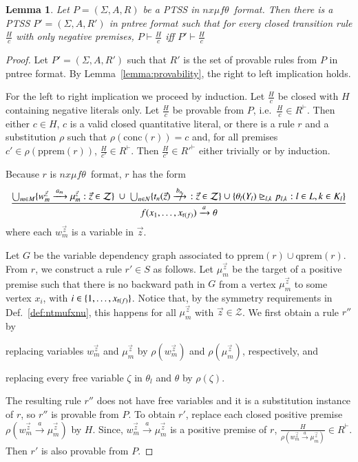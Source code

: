 \documentclass[submission,copyright,creativecommons]{eptcs}
\newtheorem{lemma}{Lemma}
\newcommand{\ddedrule}[2]{\frac{\displaystyle #1}{\displaystyle #2}}
\newcommand{\dedrule}[2]{\frac{#1}{#2}}
\newcommand{\trans}[1][]{\xrightarrow{\, {#1} \, }}
\newcommand{\ntrans}[1][]{\mathrel{{\trans[#1]}\makebox[0em][r]{$\not$\hspace{2ex}}}{\!}}
\newcommand{\gtgeq}{\trianglerighteq}
\newcommand{\rank}{\mathop{\sf r}}
\newcommand{\pprem}[1]{\textrm{pprem}(#1)}
\newcommand{\qprem}[1]{\textrm{qprem}(#1)}
\newcommand{\conc}[1]{\textrm{conc}(#1)}
\newcommand{\nxmuft}{\ensuremath{\textit{nx}\mu\textit{f}\theta}}
\newcommand{\proves}{\vdash}
\begin{document}
\begin{lemma}\label{lemma:pntree}
  Let $P = (\Sigma,A, R)$ be a PTSS in \nxmuft\ format.
  Then there is a PTSS $P' = (\Sigma, A, R')$ in
  pntree format such that for every closed transition rule $\dedrule{H}{c}$
  with only negative premises,
  $P \proves \dedrule{H}{c}$ iff $P' \proves \dedrule{H}{c}$
\end{lemma}
\begin{proof}
 Let $P' = (\Sigma, A, R')$ such that $R'$ is the set of provable rules 
 from $P$ in pntree format. 
 By Lemma~\ref{lemma:provability}, the right to left implication holds. 

 For the left to right implication we proceed by induction.
Let $\dedrule{H}{c}$ be closed with $H$ containing negative literals
 only. Let $\dedrule{H}{c}$ be provable from $P$,
 i.e.\ $\dedrule{H}{c}\in R^\proves$.  Then either $c\in H$, $c$ is a
 valid closed quantitative literal, or there is a rule $r$ and a
 substitution $\rho$ such that $\rho(\conc{r}) = c$ and, for all
 premises $c' \in \rho(\pprem{r})$, $\dedrule{H}{c'}\in R^\proves$.
 Then $\dedrule{H}{c'}\in {R'}^\proves$ either trivially or by
 induction.

 Because $r$ is \nxmuft\ format, $r$ has the form
\[
 \ddedrule {
	{\textstyle
         \bigcup_{m\in M}
           \{ w_m^{\vec{z}} \trans[a_m]\mu_m^{\vec{z}} : \vec{z}\in \mathcal{Z} \} \ \cup \
         \bigcup_{n\in N}
           \{ t_n(\vec{z})\ntrans[b_n] : \vec{z}\in \mathcal{Z} \} \  \cup \
	  }
{\textstyle
	    \{ \theta_l(Y_l)\gtgeq_{l,k} p_{l,k} : l\in L, k \in K_l \}
	  }
      }
      {f(x_1,\ldots,x_{\rank(f)}) \trans[a] \theta }
 \]
where each $w_m^{\vec{z}}$ is a variable in $\vec{z}$.


 Let $G$ be the variable dependency graph associated to
 $\pprem{r}\cup\qprem{r}$.
From $r$, we construct a rule $r'\in S$ as follows.
Let $\mu_m^{\vec{z}}$ be the target of a positive premise such that
 there is no backward path in $G$ from a vertex $\mu_m^{\vec{z}}$ to
 some vertex $x_i$, with $i\in\{1,\ldots,x_{\rank(f)}\}$.  Notice
 that, by the symmetry requirements in Def.~\ref{def:ntmufxnu}, this
 happens for all $\mu_m^{\vec{z}}$ with $\vec{z}\in\mathcal{Z}$.
We first obtain a rule $r''$ by
 \begin{inparaenum}[(i)]
 \item replacing variables $w_m^{\vec{z}}$ and $\mu_m^{\vec{z}}$ by
   $\rho(w_m^{\vec{z}})$ and $\rho(\mu_m^{\vec{z}})$, respectively,
   and
 \item replacing every free variable $\zeta$ in $\theta_l$ and $\theta$ by
   $\rho(\zeta)$.
 \end{inparaenum}
The resulting rule $r''$ does not have free variables and it is a
 substitution instance of $r$, so $r''$ is provable from $P$.
To obtain $r'$, replace each closed positive premise
 $\rho(w_m^{\vec{z}}\trans[a]\mu_m^{\vec{z}})$ by $H$.  Since,
 $w_m^{\vec{z}}\trans[a]\mu_m^{\vec{z}}$ is a positive premise of $r$,
 $\frac{H}{\rho(w_m^{\vec{z}}\trans[a]\mu_m^{\vec{z}})}\in R^\proves$.
 Then $r'$ is also provable from $P$.


\end{proof}
\end{document}
